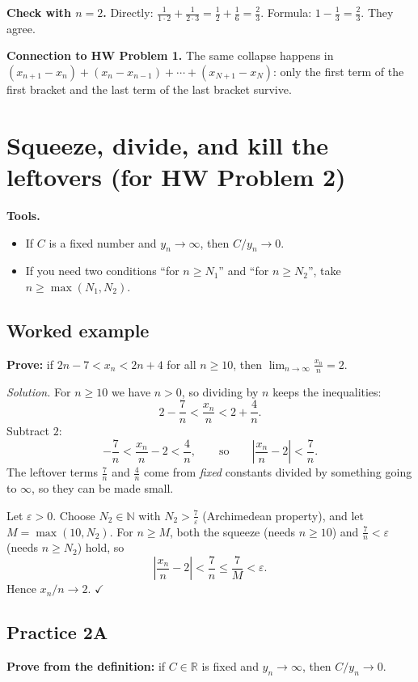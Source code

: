 \documentclass[11pt]{article}
\begin{document}
\textbf{Check with $n=2$.} Directly:
$\frac{1}{1\cdot2}+\frac{1}{2\cdot3} = \frac12+\frac16 = \frac23$. Formula:
$1-\frac13 = \frac23$. They agree.

\textbf{Connection to HW Problem 1.} The same collapse happens in
$(x_{n+1}-x_n)+(x_n-x_{n-1})+\cdots+(x_{N+1}-x_N)$: only the first term of
the first bracket and the last term of the last bracket survive.

\vspace{1cm}

\newpage
\section{Squeeze, divide, and kill the leftovers \quad (for HW Problem 2)}

\textbf{Tools.}
\begin{itemize}
  \item If $C$ is a fixed number and $y_n\to\infty$, then $C/y_n\to 0$.
  \item If you need two conditions ``for $n\ge N_1$'' and ``for $n\ge N_2$'',
        take $n\ge\max(N_1,N_2)$.
\end{itemize}

\subsection*{Worked example}
\textbf{Prove:} if $2n-7 < x_n < 2n+4$ for all $n\ge 10$, then
$\displaystyle\lim_{n\to\infty}\frac{x_n}{n}=2$.

\emph{Solution.} For $n\ge 10$ we have $n>0$, so dividing by $n$ keeps the
inequalities:
\[
  2-\frac{7}{n} < \frac{x_n}{n} < 2+\frac{4}{n}.
\]
Subtract $2$:
\[
  -\frac7n < \frac{x_n}{n}-2 < \frac4n,
  \qquad\text{so}\qquad
  \left|\frac{x_n}{n}-2\right| < \frac7n .
\]
The leftover terms $\frac7n$ and $\frac4n$ come from \emph{fixed} constants
divided by something going to $\infty$, so they can be made small.

Let $\varepsilon>0$. Choose $N_2\in\mathbb{N}$ with $N_2>\frac{7}{\varepsilon}$
(Archimedean property), and let $M=\max(10,N_2)$. For $n\ge M$, both the
squeeze (needs $n\ge10$) and $\frac7n<\varepsilon$ (needs $n\ge N_2$) hold, so
\[
  \left|\frac{x_n}{n}-2\right| < \frac7n \le \frac{7}{M} < \varepsilon .
\]
Hence $x_n/n\to 2$. \hfill$\checkmark$

\subsection*{Practice 2A}
\textbf{Prove from the definition:} if $C\in\mathbb{R}$ is fixed and
$y_n\to\infty$, then $C/y_n\to 0$.
\end{document}
